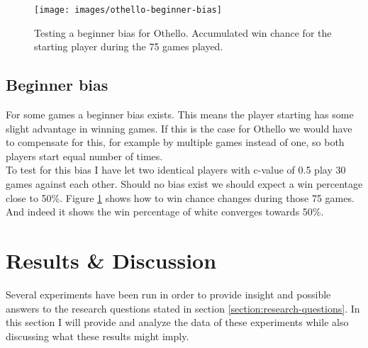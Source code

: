 \documentclass[
11pt, %
english, %
singlespacing, %
headsepline, %
]{MastersDoctoralThesis} %
\begin{document}
\begin{figure}
	\centering
	\texttt{[image: images/othello-beginner-bias]}
	\caption{Testing a beginner bias for Othello. Accumulated win chance for the starting player during the 75 games played.}
	\label{fig:othello-beginner-bias}
\end{figure}
\section{Beginner bias}
For some games a beginner bias exists. This means the player starting has some slight advantage in winning games. If this is the case for Othello we would have to compensate for this, for example by multiple games instead of one, so both players start equal number of times.\\

To test for this bias I have let two identical players with c-value of 0.5 play 30 games against each other. Should no bias exist we should expect a win percentage close to 50\%. Figure \ref{fig:othello-beginner-bias} shows how to win chance changes during those 75 games. And indeed it shows the win percentage of white converges towards 50\%.


\chapter{Results \& Discussion}

Several experiments have been run in order to provide insight and possible answers to the research questions stated in section \ref{section:research-questions}. In this section I will provide and analyze the data of these experiments while also discussing what these results might imply.
\end{document}
